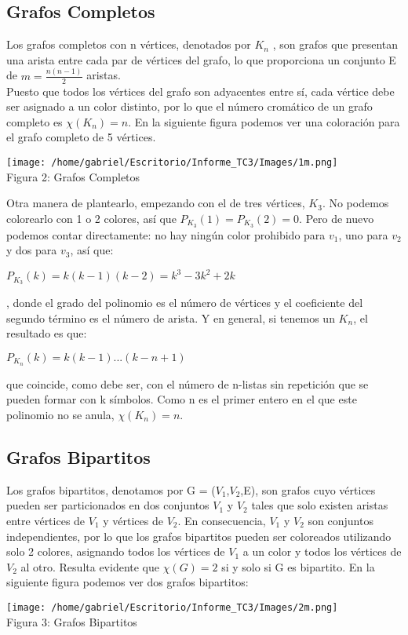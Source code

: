 \documentclass[12pt]{report}
\begin{document}
\subsection{Grafos Completos}
Los grafos completos con n vértices, denotados por $K_n$ , son grafos que presentan una arista entre cada par de vértices del grafo, lo que proporciona un conjunto E de $m = \frac{n(n-1)}{2}$ aristas.\\
Puesto que todos los vértices del grafo son adyacentes entre sí, cada vértice debe ser asignado a un color distinto, por lo que el número cromático de un grafo completo es $\chi(K_n) = n$. En la siguiente figura podemos ver una coloración para el grafo completo de 5 vértices.
\begin{center}
\texttt{[image: /home/gabriel/Escritorio/Informe\_TC3/Images/1m.png]}\\
Figura 2: Grafos Completos
\end{center}
Otra manera de plantearlo, empezando con el de tres vértices, $K_3$. No podemos colorearlo con 1 o 2 colores, así que $P_{K_3}(1)=P_{K_3}(2)=0$. Pero de nuevo podemos contar directamente: no hay ningún color prohibido para $v_1$, uno para $v_2$ y dos para $v_3$, así que:
\begin{center}
$P_{K_3}(k)=k(k-1)(k-2)=k^3-3k^2+2k$
\end{center}
, donde el grado del polinomio es el número de vértices y el coeficiente del segundo término es el número de arista. 
Y en general, si tenemos un $K_n$, el resultado es que:
\begin{center}
$P_{K_n}(k)=k(k-1)...(k-n+1)$
\end{center}
que coincide, como debe ser, con el número de n-listas sin repetición que se pueden formar con k símbolos. Como n es el primer entero en el que este polinomio no se anula, $\chi(K_n)=n$.
 
\subsection{Grafos Bipartitos}
Los grafos bipartitos, denotamos por G = ($V_1$,$V_2$,E), son grafos cuyo vértices pueden ser particionados en dos conjuntos $V_1$ y $V_2$ tales que solo existen aristas entre vértices de $V_1$ y vértices de $V_2$. En consecuencia, $V_1$ y $V_2$ son conjuntos independientes, por lo que los grafos bipartitos pueden ser coloreados utilizando solo 2 colores, asignando todos los vértices de $V_1$ a un color y todos los vértices de $V_2$ al otro. Resulta evidente que $\chi(G) = 2$ si y solo si G es bipartito. En la siguiente figura podemos ver dos grafos bipartitos:
\begin{center}
\texttt{[image: /home/gabriel/Escritorio/Informe\_TC3/Images/2m.png]}\\
Figura 3: Grafos Bipartitos
\end{center}
\end{document}
